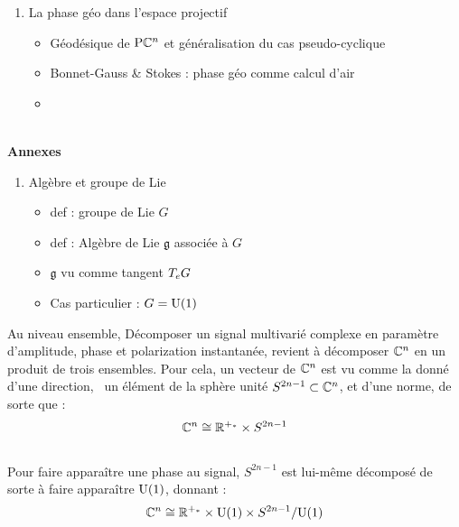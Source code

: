 \begin{enumerate}[label=\Roman* --- ]
\begin{enumerate}[label=\arabic{enumi}.\arabic* --- ]
		\item La phase géo dans l'espace projectif
		\begin{itemize} \normalfont
			
			\item Géodésique de $\PC{n}$ et généralisation du cas pseudo-cyclique
			
		
			\item Bonnet-Gauss  \& Stokes : phase géo comme calcul d'air
	
			
			\item {}
		
		\end{itemize}
	\end{enumerate}
\end{enumerate}
\skipl
\\
\textbf{Annexes}
\begin{enumerate}[label=\Alph* --- ] \bfseries
	
	
	\item Algèbre et groupe de Lie
	\begin{itemize}\normalfont
		
		\item def : groupe de Lie $G$
		
		\item def : Algèbre de Lie $\mathfrak{g}$ associée à $G$
		
		\item $\mathfrak{g}$ vu comme tangent $\tg[e]{G}$
		
		\item Cas particulier : $G=\U{1}$
		
	\end{itemize}
\end{enumerate}

\newpage

Au niveau ensemble, Décomposer un signal multivarié complexe en paramètre d'amplitude, phase et polarization instantanée, revient à décomposer $\C^n$ en un produit de trois ensembles. Pour cela, un vecteur de $\C^n$ est vu comme la donné d'une direction, \ie~un élément de la sphère unité $S^{2n-1}\subset\C^n$, et d'une norme, de sorte que :
\[\C^n \cong \R^{+_*} \times S^{2n-1}\]
\\
Pour faire apparaître une phase au signal, $S^{2n-1}$ est lui-même décomposé de sorte à faire apparaître $\U{1}$, donnant :
\[\C^n \cong \R^{+_*} \times \U{1} \times S^{2n-1}/\U{1}\]

